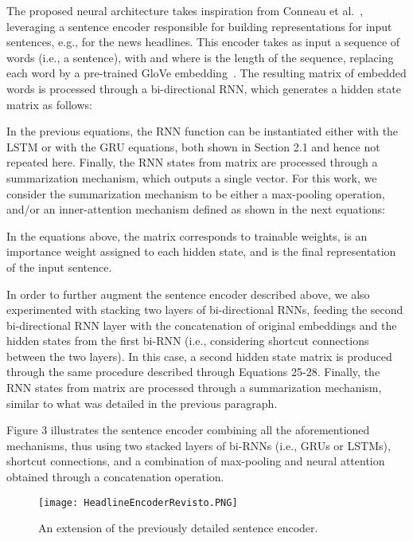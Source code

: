 The proposed neural architecture takes inspiration from Conneau et al.~\cite{supervised}, leveraging a sentence encoder responsible for building representations for input sentences, e.g., for the news headlines. This encoder takes as input a sequence of  words (i.e., a sentence), with  and where  is the length of the sequence, replacing each word by a pre-trained GloVe embedding~\cite{glove}. The resulting matrix of embedded words  is processed through a bi-directional RNN, which  generates a hidden state matrix  as follows:





In the previous equations, the RNN function can be instantiated either with the LSTM or with the GRU equations, both shown in Section 2.1 and hence not repeated here. Finally, the RNN states  from matrix  are processed through a summarization mechanism, which outputs a single vector. For this work, we consider the summarization mechanism to be either a max-pooling operation, and/or an inner-attention mechanism defined as shown in the next equations:



In the equations above, the matrix  corresponds to trainable weights,  is an importance weight assigned to each hidden state, and  is the final representation of the input sentence.

In order to further augment the sentence encoder described above, we also experimented with stacking two layers of bi-directional RNNs, feeding the second bi-directional RNN layer with the concatenation of original embeddings  and the hidden states  from the first bi-RNN (i.e., considering shortcut connections between the two layers). In this case, a second hidden state matrix  is produced through the same procedure described through Equations 25-28. Finally, the RNN states  from matrix  are processed through a summarization mechanism, similar to what was detailed in the previous paragraph. 

Figure 3 illustrates the sentence encoder combining all the aforementioned mechanisms, thus using two stacked layers of bi-RNNs (i.e., GRUs or LSTMs), shortcut connections, and a combination of max-pooling and neural attention obtained through a concatenation operation.

\begin{figure}[t!]
  \begin{center}
  \texttt{[image: HeadlineEncoderRevisto.PNG]}
  \caption{An extension of the previously detailed sentence encoder.}
  \label{fig:headencoder}
  \end{center}
\end{figure}


